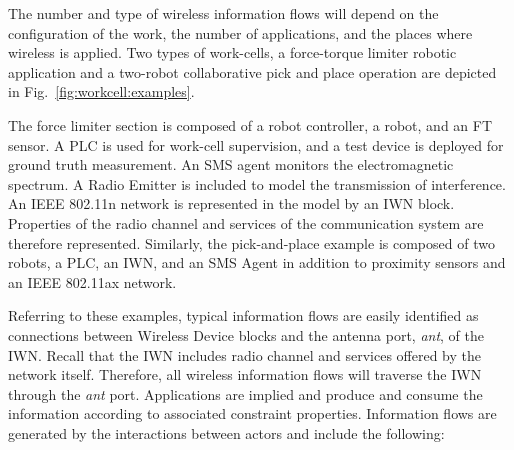 \documentclass[journal, twoside]{IEEEtran}
\begin{document}
	The number and type of wireless information flows will depend on the configuration of the work, the number of applications, and the places where wireless is applied. Two types of work-cells, a force-torque limiter robotic application and a two-robot collaborative pick and place operation are depicted in Fig.~\ref{fig:workcell:examples}.
	
	The force limiter section is composed of a robot controller, a robot, and an FT sensor. A PLC is used for work-cell supervision, and a test device is deployed for ground truth measurement.  An SMS agent monitors the electromagnetic spectrum.  A Radio Emitter is included to model the transmission of interference.  An IEEE 802.11n network is represented in the model by an IWN block. Properties of the radio channel and services of the communication system are therefore represented. Similarly, the pick-and-place example is composed of two robots, a PLC, an IWN, and an SMS Agent in addition to proximity sensors and an IEEE 802.11ax network.
	
	Referring to these examples, typical information flows are easily identified as connections between Wireless Device blocks and the antenna port, \textit{ant}, of the IWN.  Recall that the IWN includes radio channel and services offered by the network itself.  Therefore, all wireless information flows will traverse the IWN through the \textit{ant} port.  Applications are implied and produce and consume the information according to associated constraint properties.  Information flows are generated by the interactions between actors and include the following:  
	
\end{document}
